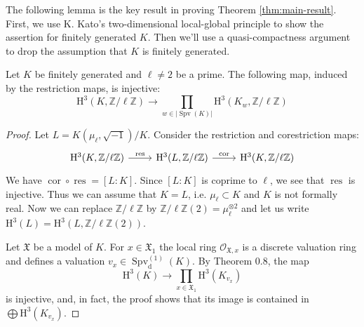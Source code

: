 The following lemma is the key result in proving Theorem \ref{thm:main-result}. First, we use K. Kato's two-dimensional local-global principle to show the assertion for finitely generated $K$. Then we'll use a quasi-compactness argument to drop the assumption that $K$ is finitely generated.

\begin{lemma}\label{2.4-finitelygenerated}
Let $K$ be finitely generated and $\ell\neq 2$ be a prime. The following map, induced by the restriction maps, is injective:
\[ \mathrm{H}^3(K,\mathbb{Z}/\ell\mathbb{Z})\longrightarrow\prod_{w\in |\operatorname{Spv}(K)| }\mathrm{H}^3(K_w,\mathbb{Z}/\ell\mathbb{Z}) \]
\end{lemma}

\begin{proof}
Let $L=K(\mu_{\ell},\sqrt{-1})/K$. Consider the restriction and corestriction maps:
\[ \begin{tikzcd}
\mathrm{H}^3(K,\mathbb{Z}/\ell\mathbb{Z}) \ar[r, "\operatorname{res}"] & \mathrm{H}^3(L,\mathbb{Z}/\ell\mathbb{Z})\ar[r, "\operatorname{cor}"]& \mathrm{H}^3(K,\mathbb{Z}/\ell\mathbb{Z}) 
\end{tikzcd} \]
We have $\operatorname{cor}\circ\operatorname{res} = [L:K]$. Since $[L:K]$ is coprime to $\ell$, we see that $\operatorname{res}$ is injective. Thus we can assume that $K=L$, i.e. $\mu_{\ell}\subset K$ and $K$ is not formally real. Now we can replace $\mathbb{Z}/\ell\mathbb{Z}$ by $\mathbb{Z}/\ell\mathbb{Z}(2) = \mu_{\ell}^{\otimes 2}$ and let us write $\mathrm{H}^3(L) = \mathrm{H}^3(L, \mathbb{Z}/\ell\mathbb{Z}(2))$. 

Let $\mathfrak{X}$ be a model of $K$. For $x\in\mathfrak{X}_1$ the local ring $\mathcal{O}_{\mathfrak{X}, x}$ is a discrete valuation ring and defines a valuation $v_x\in\operatorname{Spv}_\text{d}^{(1)}(K)$. By \cite{Ka86} Theorem 0.8, the map
\[ \mathrm{H}^3(K)\longrightarrow \prod_{x\in\mathfrak{X}_1}\mathrm{H}^3(K_{v_x}) \]
is injective, and, in fact, the proof shows that its image is contained in $\bigoplus \mathrm{H}^3(K_{v_x})$. 


\end{proof}
